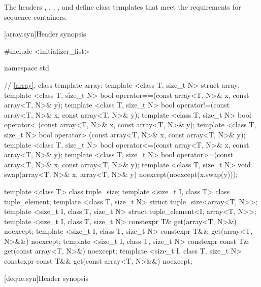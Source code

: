 \pnum
The headers , , ,
, and  define class templates that meet the
requirements for sequence containers.

[array.syn]{Header  synopsis}

%
\begin{codeblock}
#include <initializer_list>

namespace std {
  // \ref{array}, class template array:
  template <class T, size_t N> struct array;
  template <class T, size_t N>
    bool operator==(const array<T, N>& x, const array<T, N>& y);
  template <class T, size_t N>
    bool operator!=(const array<T, N>& x, const array<T, N>& y);
  template <class T, size_t N>
    bool operator< (const array<T, N>& x, const array<T, N>& y);
  template <class T, size_t N>
    bool operator> (const array<T, N>& x, const array<T, N>& y);
  template <class T, size_t N>
    bool operator<=(const array<T, N>& x, const array<T, N>& y);
  template <class T, size_t N>
    bool operator>=(const array<T, N>& x, const array<T, N>& y);
  template <class T, size_t N>
    void swap(array<T, N>& x, array<T, N>& y) noexcept(noexcept(x.swap(y)));

  template <class T> class tuple_size;
  template <size_t I, class T> class tuple_element;
  template <class T, size_t N>
    struct tuple_size<array<T, N>>;
  template <size_t I, class T, size_t N>
    struct tuple_element<I, array<T, N>>;
  template <size_t I, class T, size_t N>
    constexpr T& get(array<T, N>&) noexcept;
  template <size_t I, class T, size_t N>
    constexpr T&& get(array<T, N>&&) noexcept;
  template <size_t I, class T, size_t N>
    constexpr const T& get(const array<T, N>&) noexcept;
  template <size_t I, class T, size_t N>
    constexpr const T&& get(const array<T, N>&&) noexcept;
}
\end{codeblock}

[deque.syn]{Header  synopsis}


